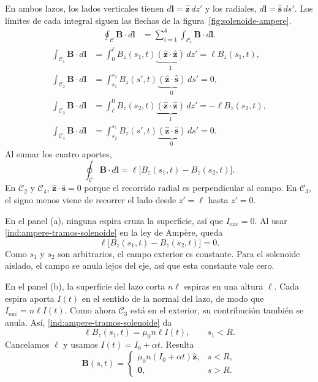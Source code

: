 \documentclass[11pt]{article}
\begin{document}
En ambos lazos, los lados verticales tienen
$d\mathbf l=\hat{\mathbf z}\,dz'$ y los radiales,
$d\mathbf l=\hat{\mathbf s}\,ds'$. Los límites de cada integral
siguen las flechas de la figura~\ref{fig:solenoide-ampere}.
\begin{align*}
    \oint_{\mathcal C}\mathbf B\cdot d\mathbf l
    &=\sum_{i=1}^4\int_{\mathcal C_i}\mathbf B\cdot d\mathbf l.
\end{align*}
\begin{align*}
    \int_{\mathcal C_1}\mathbf B\cdot d\mathbf l
    &=\int_0^\ell B_z(s_1,t)
      \underbrace{(\hat{\mathbf z}\cdot\hat{\mathbf z})}_{1}\,dz'
      =\ell B_z(s_1,t),\\[3pt]
    \int_{\mathcal C_2}\mathbf B\cdot d\mathbf l
    &=\int_{s_1}^{s_2} B_z(s',t)
      \underbrace{(\hat{\mathbf z}\cdot\hat{\mathbf s})}_{0}\,ds'
      =0,\\[3pt]
    \int_{\mathcal C_3}\mathbf B\cdot d\mathbf l
    &=\int_\ell^0 B_z(s_2,t)
      \underbrace{(\hat{\mathbf z}\cdot\hat{\mathbf z})}_{1}\,dz'
      =-\ell B_z(s_2,t),\\[3pt]
    \int_{\mathcal C_4}\mathbf B\cdot d\mathbf l
    &=\int_{s_2}^{s_1} B_z(s',t)
      \underbrace{(\hat{\mathbf z}\cdot\hat{\mathbf s})}_{0}\,ds'
      =0.
\end{align*}
Al sumar los cuatro aportes,
\begin{equation}
    \oint_{\mathcal C}\mathbf B\cdot d\mathbf l
    =\ell\bigl[B_z(s_1,t)-B_z(s_2,t)\bigr].
    \label{ind:ampere-tramos-solenoide}
\end{equation}
En $\mathcal C_2$ y $\mathcal C_4$,
$\hat{\mathbf z}\cdot\hat{\mathbf s}=0$ porque el recorrido
radial es perpendicular al campo. En $\mathcal C_3$, el signo
menos viene de recorrer el lado desde $z'=\ell$ hasta $z'=0$.

En el panel (a), ninguna espira cruza la superficie, así que
$I_{\mathrm{enc}}=0$. Al usar \eqref{ind:ampere-tramos-solenoide}
en la ley de Ampère, queda
\[
    \ell\bigl[B_z(s_1,t)-B_z(s_2,t)\bigr]=0.
\]
Como $s_1$ y $s_2$ son arbitrarios, el campo exterior es constante.
Para el solenoide aislado, el campo se anula lejos del eje, así
que esta constante vale cero.

En el panel (b), la superficie del lazo corta $n\ell$ espiras
en una altura $\ell$. Cada espira aporta $I(t)$ en el sentido
de la normal del lazo, de modo que $I_{\mathrm{enc}}=n\ell I(t)$.
Como ahora $\mathcal C_3$ está en el exterior, su contribución
también se anula. Así, \eqref{ind:ampere-tramos-solenoide} da
\[
    \ell B_z(s_1,t)=\mu_0 n\ell I(t),\qquad s_1<R.
\]
Cancelamos $\ell$ y usamos $I(t)=I_0+\alpha t$. Resulta
\begin{equation}
    \mathbf B(s,t)=
    \begin{cases}
        \mu_0 n(I_0+\alpha t)\hat{\mathbf z}, & s<R,\\
        \mathbf 0, & s>R.
    \end{cases}
\end{equation}
\end{document}

